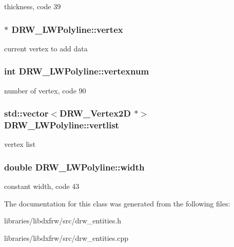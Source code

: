 thickness, code 39 \hypertarget{classDRW__LWPolyline_af59a2babb12d2f8865991c39cf464538}{
\subsubsection[{vertex}]{$\ast$ D\-R\-W\-\_\-\-L\-W\-Polyline\-::vertex}}\label{classDRW__LWPolyline_af59a2babb12d2f8865991c39cf464538}
current vertex to add data \hypertarget{classDRW__LWPolyline_a7aa318239f9956b6e0331199491e20a5}{
\subsubsection[{vertexnum}]{\setlength{\rightskip}{0pt plus 5cm}int D\-R\-W\-\_\-\-L\-W\-Polyline\-::vertexnum}}\label{classDRW__LWPolyline_a7aa318239f9956b6e0331199491e20a5}
number of vertex, code 90 \hypertarget{classDRW__LWPolyline_a2da7f3449eec6588fb3765a1c9541404}{
\subsubsection[{vertlist}]{\setlength{\rightskip}{0pt plus 5cm}std\-::vector$<${\bf D\-R\-W\-\_\-\-Vertex2\-D} $\ast$$>$ D\-R\-W\-\_\-\-L\-W\-Polyline\-::vertlist}}\label{classDRW__LWPolyline_a2da7f3449eec6588fb3765a1c9541404}
vertex list \hypertarget{classDRW__LWPolyline_aedd6dd732a0b425711921104b52f8ce9}{
\subsubsection[{width}]{\setlength{\rightskip}{0pt plus 5cm}double D\-R\-W\-\_\-\-L\-W\-Polyline\-::width}}\label{classDRW__LWPolyline_aedd6dd732a0b425711921104b52f8ce9}
constant width, code 43 

The documentation for this class was generated from the following files\-:\begin{DoxyCompactItemize}
\item 
libraries/libdxfrw/src/drw\-\_\-entities.\-h\item 
libraries/libdxfrw/src/drw\-\_\-entities.\-cpp\end{DoxyCompactItemize}
